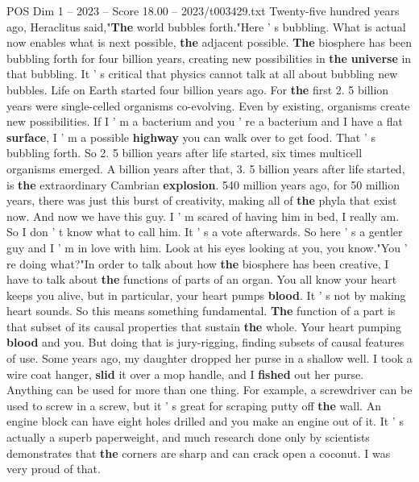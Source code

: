 \begin{textsample}{POS Dim 1 – 2023 – Score 18.00 – 2023/t003429.txt}  \label{ex:f1_pos_065}
Twenty-five hundred years ago, Heraclitus said,"\textbf{The} world bubbles forth."Here ' s bubbling.
What is actual now enables what is next possible, \textbf{the} adjacent possible. \textbf{The} biosphere has been bubbling forth for four billion years, creating new possibilities in \textbf{the} \textbf{universe} in that bubbling.
It ' s critical that physics cannot talk at all about bubbling new bubbles.
Life on Earth started four billion years ago.
For \textbf{the} first 2. 5 billion years were single-celled organisms co-evolving.
Even by existing, organisms create new possibilities.
If I ' m a bacterium and you ' re a bacterium and I have a flat \textbf{surface}, I ' m a possible \textbf{highway} you can walk over to get food.
That ' s bubbling forth.
So 2. 5 billion years after life started, six times multicell organisms emerged.
A billion years after that, 3. 5 billion years after life started, is \textbf{the} extraordinary Cambrian \textbf{explosion}. 540 million years ago, for 50 million years, there was just this burst of creativity, making all of \textbf{the} phyla that exist now.
And now we have this guy.
I ' m scared of having him in bed, I really am.
So I don ' t know what to call him.
It ' s a vote afterwards.
So here ' s a gentler guy and I ' m in love with him.
Look at his eyes looking at you, you know."You ' re doing what?"In order to talk about how \textbf{the} biosphere has been creative, I have to talk about \textbf{the} functions of parts of an organ.
You all know your heart keeps you alive, but in particular, your heart pumps \textbf{blood}.
It ' s not by making heart sounds.
So this means something fundamental. \textbf{The} function of a part is that subset of its causal properties that sustain \textbf{the} whole.
Your heart pumping \textbf{blood} and you.
But doing that is jury-rigging, finding subsets of causal features of use.
Some years ago, my daughter dropped her purse in a shallow well.
I took a wire coat hanger, \textbf{slid} it over a mop handle, and I \textbf{fished} out her purse.
Anything can be used for more than one thing.
For example, a screwdriver can be used to screw in a screw, but it ' s great for scraping putty off \textbf{the} wall.
An engine block can have eight holes drilled and you make an engine out of it.
It ' s actually a superb paperweight, and much research done only by scientists demonstrates that \textbf{the} corners are sharp and can crack open a coconut.
I was very proud of that.

\end{textsample}
